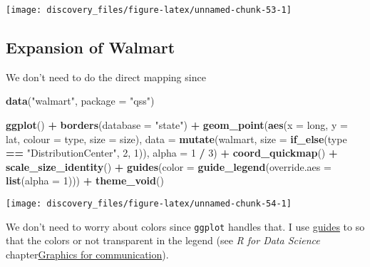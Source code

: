 \documentclass[]{book}
\newenvironment{Shaded}{\begin{snugshade}}{\end{snugshade}}
\newcommand{\DataTypeTok}[1]{\textcolor[rgb]{0.13,0.29,0.53}{#1}}
\newcommand{\DecValTok}[1]{\textcolor[rgb]{0.00,0.00,0.81}{#1}}
\newcommand{\KeywordTok}[1]{\textcolor[rgb]{0.13,0.29,0.53}{\textbf{#1}}}
\newcommand{\NormalTok}[1]{#1}
\newcommand{\OperatorTok}[1]{\textcolor[rgb]{0.81,0.36,0.00}{\textbf{#1}}}
\newcommand{\StringTok}[1]{\textcolor[rgb]{0.31,0.60,0.02}{#1}}
\theoremstyle{definition}
\theoremstyle{definition}
\theoremstyle{definition}
\theoremstyle{remark}
\begin{document}
\begin{center}\texttt{[image: discovery\_files/figure-latex/unnamed-chunk-53-1]} \end{center}

\hypertarget{expansion-of-walmart}{%
\subsection{Expansion of Walmart}\label{expansion-of-walmart}}

We don't need to do the direct mapping since

\begin{Shaded}
\begin{Highlighting}[]
\KeywordTok{data}\NormalTok{(}\StringTok{"walmart"}\NormalTok{, }\DataTypeTok{package =} \StringTok{"qss"}\NormalTok{)}

\KeywordTok{ggplot}\NormalTok{() }\OperatorTok{+}
\StringTok{  }\KeywordTok{borders}\NormalTok{(}\DataTypeTok{database =} \StringTok{"state"}\NormalTok{) }\OperatorTok{+}
\StringTok{  }\KeywordTok{geom_point}\NormalTok{(}\KeywordTok{aes}\NormalTok{(}\DataTypeTok{x =}\NormalTok{ long, }\DataTypeTok{y =}\NormalTok{ lat, }\DataTypeTok{colour =}\NormalTok{ type, }\DataTypeTok{size =}\NormalTok{ size),}
             \DataTypeTok{data =} \KeywordTok{mutate}\NormalTok{(walmart,}
                           \DataTypeTok{size =} \KeywordTok{if_else}\NormalTok{(type }\OperatorTok{==}\StringTok{ "DistributionCenter"}\NormalTok{, }\DecValTok{2}\NormalTok{, }\DecValTok{1}\NormalTok{)),}
             \DataTypeTok{alpha =} \DecValTok{1} \OperatorTok{/}\StringTok{ }\DecValTok{3}\NormalTok{) }\OperatorTok{+}
\StringTok{  }\KeywordTok{coord_quickmap}\NormalTok{() }\OperatorTok{+}
\StringTok{  }\KeywordTok{scale_size_identity}\NormalTok{() }\OperatorTok{+}
\StringTok{  }\KeywordTok{guides}\NormalTok{(}\DataTypeTok{color =} \KeywordTok{guide_legend}\NormalTok{(}\DataTypeTok{override.aes =} \KeywordTok{list}\NormalTok{(}\DataTypeTok{alpha =} \DecValTok{1}\NormalTok{))) }\OperatorTok{+}
\StringTok{  }\KeywordTok{theme_void}\NormalTok{()}
\end{Highlighting}
\end{Shaded}

\begin{center}\texttt{[image: discovery\_files/figure-latex/unnamed-chunk-54-1]} \end{center}

We don't need to worry about colors since \texttt{ggplot} handles that.
I use \href{http://docs.ggplot2.org/current/guides.html}{guides} to so
that the colors or not transparent in the legend (see \emph{R for Data
Science}
chapter\href{http://r4ds.had.co.nz/graphics-for-communication.html}{Graphics
for communication}).
\end{document}
